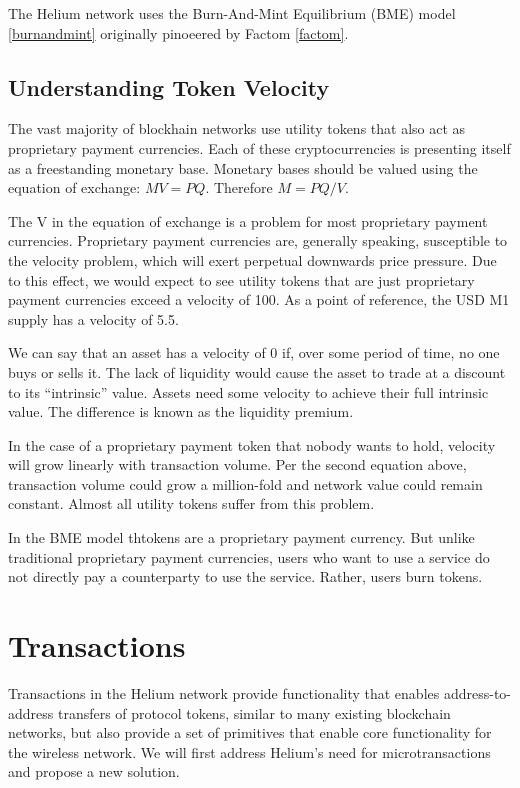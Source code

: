 \documentclass[10pt, nonatbib, nocopyrightspace, reprint]{sigplanconf}
\begin{document}
The Helium network uses the Burn-And-Mint Equilibrium (BME) model \ref{burnandmint} originally pinoeered by Factom \ref{factom}. 

\subsection{Understanding Token Velocity}

The vast majority of blockhain networks use utility tokens that also act as proprietary payment currencies. Each of these cryptocurrencies is presenting itself as a freestanding monetary base. Monetary bases should be valued using the equation of exchange: $MV = PQ$. Therefore $M = PQ/V$.

The V in the equation of exchange is a problem for most proprietary payment currencies. Proprietary payment currencies are, generally speaking, susceptible to the velocity problem, which will exert perpetual downwards price pressure. Due to this effect, we would expect to see utility tokens that are just proprietary payment currencies exceed a velocity of 100. As a point of reference, the USD M1 supply has a velocity of 5.5.

We can say that an asset has a velocity of 0 if, over some period of time, no one buys or sells it. The lack of liquidity would cause the asset to trade at a discount to its “intrinsic” value. Assets need some velocity to achieve their full intrinsic value. The difference is known as the liquidity premium.

In the case of a proprietary payment token that nobody wants to hold, velocity will grow linearly with transaction volume. Per the second equation above, transaction volume could grow a million-fold and network value could remain constant. Almost all utility tokens suffer from this problem.


In the BME model thtokens are a proprietary payment currency. But unlike traditional proprietary payment currencies, users who want to use a service do not directly pay a counterparty to use the service. Rather, users burn tokens.





\section{Transactions}\label{transactions}

Transactions in the Helium network provide functionality that enables address-to-address transfers of protocol tokens, similar to many existing blockchain networks, but also provide a set of primitives that enable core functionality for the wireless network. We will first address Helium's need for microtransactions and propose a new solution.
\end{document}
